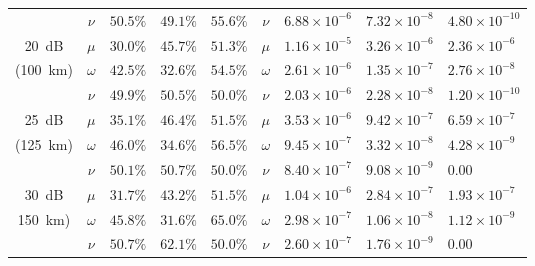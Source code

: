 \begin{table}[htbp]
\begin{tabular}{cclllclll}
        & $\nu$        & $50.5\%$                  & $49.1\%$                  & $55.6\%$                  & $\nu$        & $6.88\times10^{-6}$     & $7.32\times10^{-8}$     & $4.80\times10^{-10}$     \vspace{5pt}\\
\SI{20}{dB}   &  $\mu$        & $30.0\%$                  & $45.7\%$                  & $51.3\%$                  & $\mu$        & $1.16\times10^{-5}$     & $3.26\times10^{-6}$     & $2.36\times10^{-6}$     \\
(\SI{100}{\km}) & $\omega$        & $42.5\%$                  & $32.6\%$                  & $54.5\%$                  & $\omega$        & $2.61\times10^{-6}$     & $1.35\times10^{-7}$     & $2.76\times10^{-8}$     \\
        & $\nu$        & $49.9\%$                  & $50.5\%$                  & $50.0\%$                  & $\nu$        & $2.03\times10^{-6}$     & $2.28\times10^{-8}$     & $1.20\times10^{-10}$    \vspace{5pt}\\
        \SI{25}{dB}  & $\mu$        & $35.1\%$                  & $46.4\%$                  & $51.5\%$                  & $\mu$        & $3.53\times10^{-6}$     & $9.42\times10^{-7}$     & $6.59\times10^{-7}$     \\
(\SI{125}{\km}) & $\omega$        & $46.0\%$                  & $34.6\%$                  & $56.5\%$                  & $\omega$        & $9.45\times10^{-7}$     & $3.32\times10^{-8}$     & $4.28\times10^{-9}$\\
        & $\nu$        & $50.1\%$                  & $50.7\%$                  & $50.0\%$                  & $\nu$        & $8.40\times10^{-7}$     & $9.08\times10^{-9}$     & $0.00$     \vspace{5pt}\\
\SI{30}{dB} & $\mu$        & $31.7\%$                  & $43.2\%$                  & $51.5\%$                  & $\mu$        & $1.04\times10^{-6}$     & $2.84\times10^{-7}$     & $1.93\times10^{-7}$     \\
\SI{150}{\km}) & $\omega$        & $45.8\%$                  & $31.6\%$                  & $65.0\%$                  & $\omega$        & $2.98\times10^{-7}$     & $1.06\times10^{-8}$     & $1.12\times10^{-9}$     \\
        & $\nu$        & $50.7\%$                  & $62.1\%$                  & $50.0\%$                  & $\nu$        & $2.60\times10^{-7}$     & $1.76\times10^{-9}$     & $0.00$                  \vspace{5pt}\\

\end{tabular}
\end{table}
